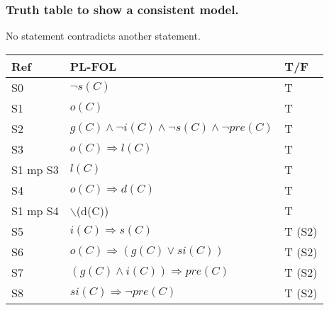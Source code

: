 \documentclass[11pt]{article}
\begin{document}
\subsubsection{Truth table to show a consistent model.}
\label{sec:orgedaf441}
No statement contradicts another statement.
\FloatBarrier
\begin{center}
\begin{tabular}{lll}
Ref & PL-FOL & T/F\\
\hline
S0 & \(\lnot s(C)\) & T\\
S1 & \(o(C)\) & T\\
S2 & \(g(C) \land \lnot i(C) \land \lnot s(C) \land \lnot pre(C)\) & T\\
S3 & \(o(C) \Rightarrow l(C)\) & T\\
S1 mp S3 & \(l(C)\) & T\\
S4 & \(o(C) \Rightarrow d(C)\) & T\\
S1 mp S4 & $\backslash$(d(C)) & T\\
S5 & \(i(C) \Rightarrow s(C)\) & T (S2)\\
S6 & \(o(C) \Rightarrow (g(C) \lor si(C))\) & T (S2)\\
S7 & \((g(C) \land i(C)) \Rightarrow pre(C)\) & T (S2)\\
S8 & \(si(C) \Rightarrow \lnot pre(C)\) & T (S2)\\
\end{tabular}
\end{center}
\FloatBarriers
\end{document}
